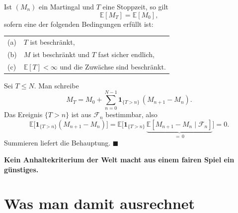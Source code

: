 \begin{merksatz}
Ist $(M_n)$ ein Martingal und $T$ eine Stoppzeit, so gilt
\[ \mathbb{E}[M_T] = \mathbb{E}[M_0] , \]
sofern eine der folgenden Bedingungen erfüllt ist:
\begin{center}
{\small
\renewcommand{\arraystretch}{1.48}
\begin{tabular}{@{}P{1.0cm}P{7.4cm}@{}}
\toprule
(a) & $T$ ist beschränkt,\\
(b) & $M$ ist beschränkt und $T$ fast sicher endlich,\\
(c) & $\mathbb{E}[T] < \infty$ und die Zuwächse sind beschränkt.\\
\bottomrule
\end{tabular}}
\end{center}

Sei $T \le N$. Man schreibe
\[ M_T = M_0 + \sum_{n=0}^{N-1} \mathbf 1_{\{T > n\}}\,(M_{n+1}-M_n) . \]
Das Ereignis $\{T > n\}$ ist aus $\mathcal F_n$ bestimmbar, also
\[ \mathbb{E}\bigl[\mathbf 1_{\{T>n\}}(M_{n+1}-M_n)\bigr] = \mathbb{E}\bigl[\mathbf 1_{\{T>n\}}\,\underbrace{\mathbb{E}[M_{n+1}-M_n \mid \mathcal F_n]}_{=\,0}\bigr] = 0 . \]
Summieren liefert die Behauptung. $\blacksquare$

\begin{center}
\begin{minipage}{0.9\textwidth}
\textbf{Kein Anhaltekriterium der Welt macht aus einem fairen Spiel ein günstiges.}
\end{minipage}
\end{center}

\begin{center}
\begin{minipage}{0.88\textwidth}
\end{minipage}
\end{center}
\end{merksatz}

\section{Was man damit ausrechnet}

